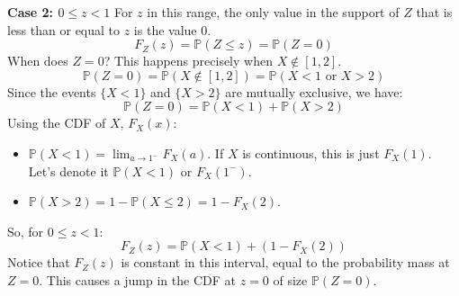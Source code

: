 \documentclass[11pt]{article}
\theoremstyle{definition}
\theoremstyle{remark}
\newcommand{\Prob}{\mathbb{P}}
\begin{document}
\textbf{Case 2: $0 \leq z < 1$}
For $z$ in this range, the only value in the support of $Z$ that is less than or equal to $z$ is the value $0$.
\[ F_Z(z) = \Prob(Z \leq z) = \Prob(Z = 0) \]
When does $Z=0$? This happens precisely when $X \notin [1, 2]$.
\[ \Prob(Z = 0) = \Prob(X \notin [1, 2]) = \Prob(X < 1 \text{ or } X > 2) \]
Since the events $\{X < 1\}$ and $\{X > 2\}$ are mutually exclusive, we have:
\[ \Prob(Z = 0) = \Prob(X < 1) + \Prob(X > 2) \]
Using the CDF of $X$, $F_X(x)$:
\begin{itemize}
    \item $\Prob(X < 1) = \lim_{a \to 1^-} F_X(a)$. If $X$ is continuous, this is just $F_X(1)$. Let's denote it $\Prob(X < 1)$ or $F_X(1^-)$.
    \item $\Prob(X > 2) = 1 - \Prob(X \leq 2) = 1 - F_X(2)$.
\end{itemize}
So, for $0 \leq z < 1$:
\[ F_Z(z) = \Prob(X < 1) + (1 - F_X(2)) \]
Notice that $F_Z(z)$ is constant in this interval, equal to the probability mass at $Z=0$. This causes a jump in the CDF at $z=0$ of size $\Prob(Z=0)$.
\end{document}
